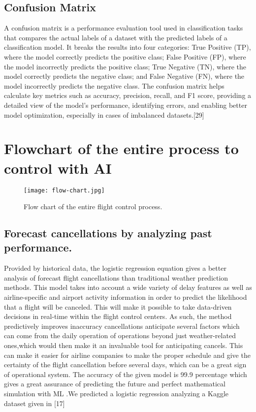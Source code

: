 \documentclass[conference]{IEEEtran}
\begin{document}
\subsection{Confusion Matrix}
A confusion matrix is a performance evaluation tool used in classification tasks that compares the actual labels of a dataset with the predicted labels of a classification model. It breaks the results into four categories: True Positive (TP), where the model correctly predicts the positive class; False Positive (FP), where the model incorrectly predicts the positive class; True Negative (TN), where the model correctly predicts the negative class; and False Negative (FN), where the model incorrectly predicts the negative class. The confusion matrix helps calculate key metrics such as accuracy, precision, recall, and F1 score, providing a detailed view of the model's performance, identifying errors, and enabling better model optimization, especially in cases of imbalanced datasets.[29]

\section{Flowchart of the entire process to control    with AI}\label{sec4}
\begin{figure}[htbp]
    \centering
    \texttt{[image: flow-chart.jpg]} %
    \caption{Flow chart of the entire flight control process.}
    \label{Figure 1}
\end{figure}
\subsection{Forecast cancellations by analyzing past performance.}\label{subsec3}
Provided by historical data, the logistic regression equation gives  a better analysis of forecast flight cancellations than traditional weather prediction methods. This model takes into account a wide variety of delay features as well as airline-specific and airport activity information in order to predict the likelihood that a flight will be canceled. This will make it possible to take data-driven decisions in real-time within the flight control centers. As such, the method predictively improves inaccuracy cancellations anticipate several factors which can come from the daily operation of operations beyond just weather-related ones,which would then make it an invaluable tool for anticipating cancels. This can make it easier for airline companies to make the proper schedule and give the certainty of the flight cancellation before several days, which can be a great sign of operational system. The accuracy of the given model is 99.9 percentage which gives a great assurance of predicting the future  and perfect mathematical simulation with ML .We predicted a logistic regression analyzing a Kaggle dataset given in [17]
\end{document}
